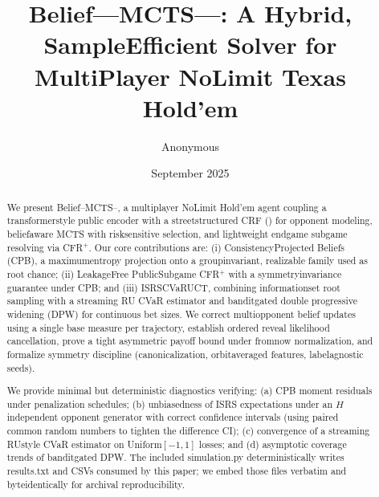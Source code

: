\theoremstyle{plain}
\newtheorem{definition}{Definition}
\newtheorem{assumption}{Assumption}
\newtheorem{lemma}{Lemma}
\newtheorem{proposition}{Proposition}
\newtheorem{theorem}{Theorem}
\newtheorem{corollary}{Corollary}

\title{Belief---MCTS---\sCRF: A Hybrid, Sample\textendash Efficient Solver for Multi\textendash Player No\textendash Limit Texas Hold'em}
\author{Anonymous}
\date{September 2025}


\maketitle

\begin{abstract}
We present Belief--MCTS--\sCRF, a multi\textendash player No\textendash Limit Hold'em agent coupling a transformer\textendash style public encoder with a street\textendash structured CRF (\sCRF) for opponent modeling, belief\textendash aware MCTS with risk\textendash sensitive selection, and lightweight endgame subgame re\textendash solving via CFR$^+$. Our core contributions are: (i) Consistency\textendash Projected Beliefs (CPB), a maximum\textendash entropy projection onto a group\textendash invariant, realizable family used as root chance; (ii) Leakage\textendash Free Public\textendash Subgame CFR$^+$ with a symmetry\textendash invariance guarantee under CPB; and (iii) IS\textendash RS\textendash CVaR\textendash UCT, combining information\textendash set root sampling with a streaming RU CVaR estimator and bandit\textendash gated double progressive widening (DPW) for continuous bet sizes. We correct multi\textendash opponent belief updates using a single base measure per trajectory, establish ordered reveal likelihood cancellation, prove a tight asymmetric payoff bound under from\textendash now normalization, and formalize symmetry discipline (canonicalization, orbit\textendash averaged features, label\textendash agnostic seeds).

We provide minimal but deterministic diagnostics verifying: (a) CPB moment residuals under penalization schedules; (b) unbiasedness of IS\textendash RS expectations under an $H$\textendash independent opponent generator with correct confidence intervals (using paired common random numbers to tighten the difference CI); (c) convergence of a streaming RU\textendash style CVaR estimator on Uniform$[-1,1]$ losses; and (d) asymptotic coverage trends of bandit\textendash gated DPW. The included simulation.py deterministically writes results.txt and CSVs consumed by this paper; we embed those files verbatim and byte\textendash identically for archival reproducibility.
\end{abstract}

